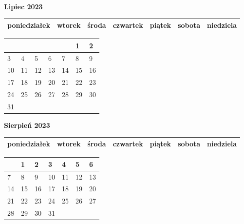 \clearpage

\begin{landscape}
    \begin{center}
        \textbf{\huge{Lipiec 2023}}
    \end{center}

    \vspace{-3mm}

    \thispagestyle{empty}
    \noindent
    \begin{tabularx}{28.7cm}{|Y|Y|Y|Y|Y|Y|Y|}
        \hline
poniedziałek & wtorek & środa & czwartek & piątek & sobota & niedziela \\ [-0.5mm]
        \hline
    \end{tabularx}

    \vspace{-0.5mm}

    \noindent
    \begin{tabularx}{28.7cm}{|X|X|X|X|X|X|X|}
        \hline
& & & & & 1 & 2 \\ [25.0mm]
\hline
3 & 4 & 5 & 6 & 7 & 8 & 9 \\ [25.0mm]
\hline
10 & 11 & 12 & 13 & 14 & 15 & 16 \\ [25.0mm]
\hline
17 & 18 & 19 & 20 & 21 & 22 & 23 \\ [25.0mm]
\hline
24 & 25 & 26 & 27 & 28 & 29 & 30 \\ [25.0mm]
\hline
31 & & & & & & \\ [25.0mm]
\hline

    \end{tabularx}
\end{landscape}

\clearpage

\begin{landscape}
    \begin{center}
        \textbf{\huge{Sierpień 2023}}
    \end{center}

    \vspace{-3mm}

    \thispagestyle{empty}
    \noindent
    \begin{tabularx}{28.7cm}{|Y|Y|Y|Y|Y|Y|Y|}
        \hline
poniedziałek & wtorek & środa & czwartek & piątek & sobota & niedziela \\ [-0.5mm]
        \hline
    \end{tabularx}

    \vspace{-0.5mm}

    \noindent
    \begin{tabularx}{28.7cm}{|X|X|X|X|X|X|X|}
        \hline
& 1 & 2 & 3 & 4 & 5 & 6 \\ [31.0mm]
\hline
7 & 8 & 9 & 10 & 11 & 12 & 13 \\ [31.0mm]
\hline
14 & 15 & 16 & 17 & 18 & 19 & 20 \\ [31.0mm]
\hline
21 & 22 & 23 & 24 & 25 & 26 & 27 \\ [31.0mm]
\hline
28 & 29 & 30 & 31 & & & \\ [31.0mm]
\hline

    \end{tabularx}
\end{landscape}

